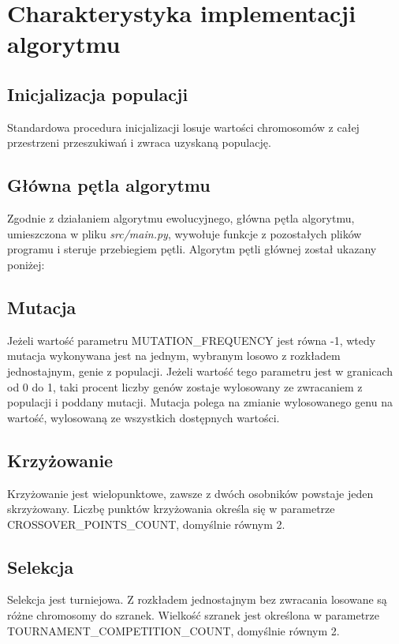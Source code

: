 \section{Charakterystyka implementacji algorytmu}

\subsection{Inicjalizacja populacji}

Standardowa procedura inicjalizacji losuje wartości chromosomów z całej przestrzeni przeszukiwań i zwraca uzyskaną populację.

\subsection{Główna pętla algorytmu}
\label{section:mainloop}

Zgodnie z działaniem algorytmu ewolucyjnego, główna pętla algorytmu, umieszczona w pliku \textit{src/main.py}, wywołuje funkcje z pozostałych plików programu i steruje przebiegiem pętli. Algorytm pętli głównej został ukazany poniżej:


\subsection{Mutacja}

Jeżeli wartość parametru MUTATION\_FREQUENCY jest równa -1, wtedy mutacja wykonywana jest na jednym, wybranym losowo z rozkładem jednostajnym, genie z populacji. Jeżeli wartość tego parametru jest w granicach od 0 do 1, taki procent liczby genów zostaje wylosowany ze zwracaniem z populacji i poddany mutacji. Mutacja polega na zmianie wylosowanego genu na wartość, wylosowaną ze wszystkich dostępnych wartości.

\subsection{Krzyżowanie}

Krzyżowanie jest wielopunktowe, zawsze z dwóch osobników powstaje jeden skrzyżowany. Liczbę punktów krzyżowania określa się w parametrze CROSSOVER\_POINTS\_COUNT, domyślnie równym 2.

\subsection{Selekcja}

Selekcja jest turniejowa. Z rozkładem jednostajnym bez zwracania losowane są różne chromosomy do szranek. Wielkość szranek jest określona w parametrze TOURNAMENT\_COMPETITION\_COUNT, domyślnie równym 2.

